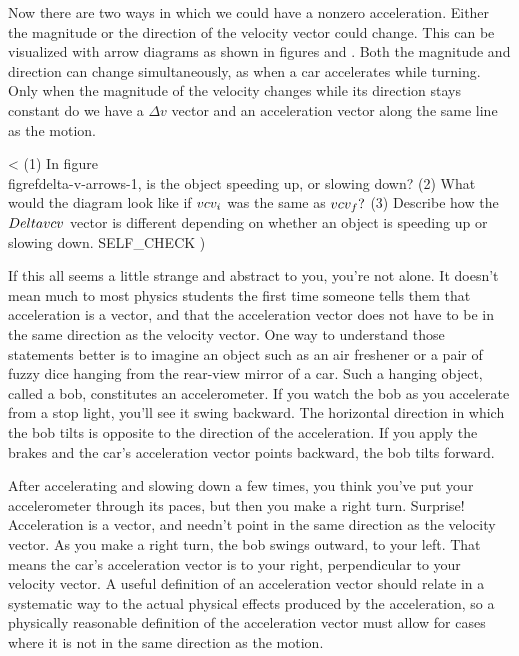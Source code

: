 Now there are two ways in which we could have a nonzero
acceleration. Either the magnitude or the direction of the
velocity vector could change. This can be visualized with
arrow diagrams as shown in figures 
 and . Both the magnitude
and direction can change simultaneously, as when a car
accelerates while turning. Only when the magnitude of the
velocity changes while its direction stays constant do we
have a $\Delta v$ vector and an acceleration vector along
the same line as the motion.

<%
(1) In figure \\figref{delta-v-arrows-1}, is the object speeding up, or slowing
down? (2) What would the diagram look like if $\\vc{v}_i$ was the
same as $\\vc{v}_f?$ (3) Describe how the $\\Delta \\vc{v}$ vector is
different depending on whether an object is speeding up or slowing down.
  SELF_CHECK
  ) %

If this all seems a little strange and abstract to you,
you're not alone. It doesn't mean much to most physics
students the first time someone tells them that acceleration
is a vector, and that the acceleration vector does not have
to be in the same direction as the velocity vector.  One way
to understand those statements better is to imagine an
object such as an air freshener or a pair of fuzzy dice
hanging from the rear-view mirror of a car.  Such a hanging
object, called a bob, constitutes an accelerometer.  If you
watch the bob as you accelerate from a stop light, you'll
see it swing backward.  The horizontal direction in which
the bob tilts is opposite to the direction of the acceleration.
If you apply the brakes and the car's acceleration vector
points backward, the bob tilts forward.

After accelerating and slowing down a few times, you think
you've put your accelerometer through its paces, but then
you make a right turn.  Surprise!  Acceleration is a vector,
and needn't point in the same direction as the velocity
vector.  As you make a right turn, the bob swings outward,
to your left.  That means the car's acceleration vector is
to your right, perpendicular to your velocity vector. A
useful definition of an acceleration vector should relate in
a systematic way to the actual physical effects produced by
the acceleration, so a physically reasonable definition of
the acceleration vector must allow for cases where it is not
in the same direction as the motion.

